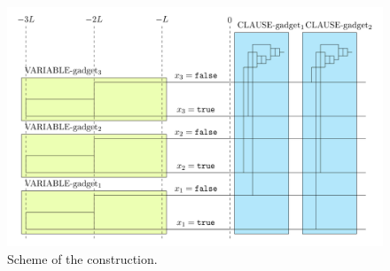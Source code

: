 \begin{figure}
\centering
\includegraphics[scale=0.1]{figures/apxhard.png}
\caption{Scheme of the construction.}
\end{figure}

